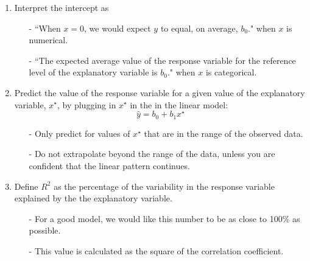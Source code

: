 \documentclass[11pt]{article}
\begin{document}
\begin{enumerate}[resume]
\item Interpret the intercept as
\begin{itemize}
\item[-] ``When $x = 0$, we would expect $y$ to equal, on average, $b_0$." when $x$ is numerical.
\item[-] ``The expected average value of the response variable for the reference level of the explanatory variable is $b_0$." when $x$ is categorical.
\end{itemize}

\item Predict the value of the response variable for a given value of the explanatory variable, $x^\star$, by plugging in $x^\star$ in the in the linear model:
\[ \hat{y} = b_0 + b_1 x^\star \]
\begin{itemize}
\item[-] Only predict for values of $x^\star$ that are in the range of the observed data.
\item[-] Do not extrapolate beyond the range of the data, unless you are confident that the linear pattern continues.
\end{itemize}

\item Define $R^2$ as the percentage of the variability in the response variable explained by the the explanatory variable.
\begin{itemize}
\item[-] For a good model, we would like this number to be as close to 100\% as possible.
\item[-] This value is calculated as the square of the correlation coefficient.
\end{itemize}

\end{enumerate}
\end{document}

